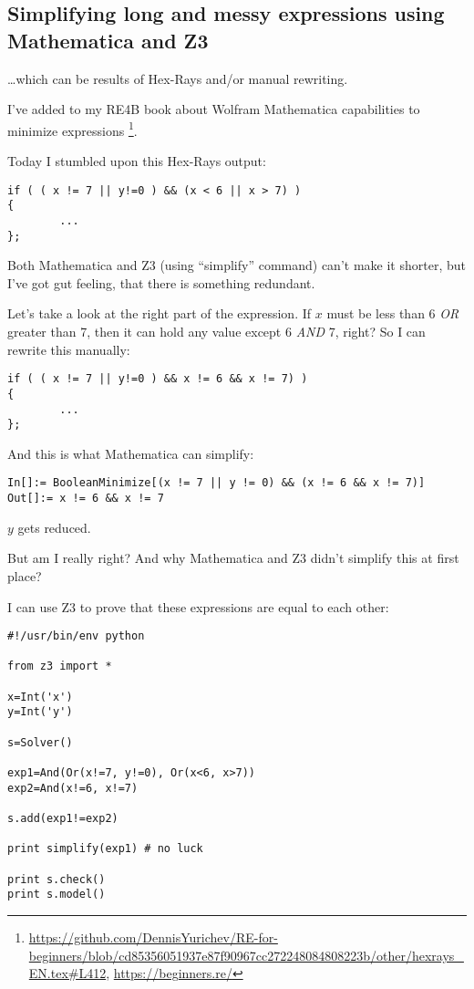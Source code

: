 \subsection{Simplifying long and messy expressions using Mathematica and Z3}

\dots which can be results of Hex-Rays and/or manual rewriting.

I've added to my RE4B book about Wolfram Mathematica capabilities to minimize expressions
\footnote{\url{https://github.com/DennisYurichev/RE-for-beginners/blob/cd85356051937e87f90967cc272248084808223b/other/hexrays_EN.tex\#L412}, \url{https://beginners.re/}}.

Today I stumbled upon this Hex-Rays output:

\begin{lstlisting}
if ( ( x != 7 || y!=0 ) && (x < 6 || x > 7) )
{
        ...
};
\end{lstlisting}

Both Mathematica and Z3 (using ``simplify'' command) can't make it shorter, but I've got gut feeling,
that there is something redundant.

Let's take a look at the right part of the expression.
If $x$ must be less than 6 \textit{OR} greater than 7, then it can hold any value except 6 \textit{AND} 7, right?
So I can rewrite this manually:

\begin{lstlisting}
if ( ( x != 7 || y!=0 ) && x != 6 && x != 7) )
{
        ...
};
\end{lstlisting}

And this is what Mathematica can simplify:

\begin{lstlisting}
In[]:= BooleanMinimize[(x != 7 || y != 0) && (x != 6 && x != 7)]
Out[]:= x != 6 && x != 7
\end{lstlisting}

$y$ gets reduced.

But am I really right?
And why Mathematica and Z3 didn't simplify this at first place?

I can use Z3 to prove that these expressions are equal to each other:

\begin{lstlisting}
#!/usr/bin/env python

from z3 import *

x=Int('x')
y=Int('y')

s=Solver()

exp1=And(Or(x!=7, y!=0), Or(x<6, x>7))
exp2=And(x!=6, x!=7)

s.add(exp1!=exp2)

print simplify(exp1) # no luck

print s.check()
print s.model()
\end{lstlisting}

